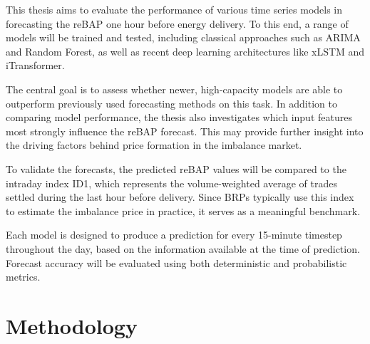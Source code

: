 \documentclass[class=scrbook, crop=false]{standalone}
\begin{document}

This thesis aims to evaluate the performance of various time series models in forecasting the \gls{reBAP} one hour before energy delivery. To this end, a range of models will be trained and tested, including classical approaches such as ARIMA and Random Forest, as well as recent deep learning architectures like xLSTM and iTransformer.

The central goal is to assess whether newer, high-capacity models are able to outperform previously used forecasting methods on this task. In addition to comparing model performance, the thesis also investigates which input features most strongly influence the \gls{reBAP} forecast. This may provide further insight into the driving factors behind price formation in the imbalance market.

To validate the forecasts, the predicted \gls{reBAP} values will be compared to the intraday index ID1, which represents the volume-weighted average of trades settled during the last hour before delivery. Since \gls{BRP}s typically use this index to estimate the imbalance price in practice, it serves as a meaningful benchmark.

Each model is designed to produce a prediction for every 15-minute timestep throughout the day, based on the information available at the time of prediction. Forecast accuracy will be evaluated using both deterministic and probabilistic metrics.

\section{Methodology}
\label{Section::Methodology}

\end{document}
